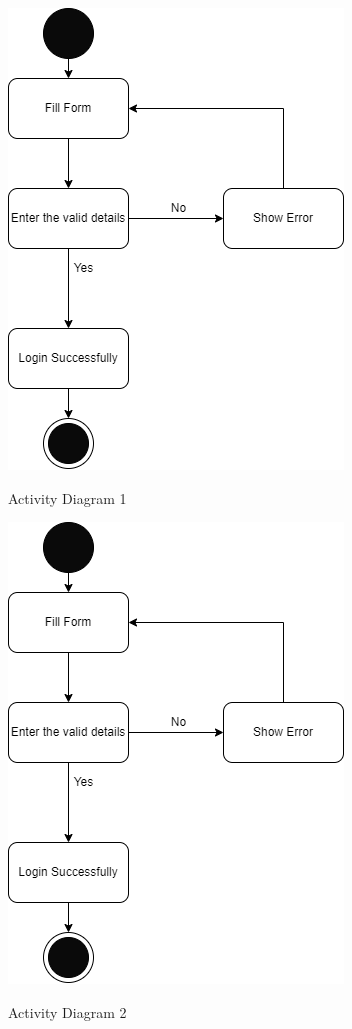\begin{figure}[H]
    \centering
    \caption{Activity Diagram 1}
    \includegraphics[scale=0.5]{./diagrams/Activity Diagram/ad-01.png}
    \label{fig:act-01}

\end{figure}


\begin{figure}[H]
    \centering
    \caption{Activity Diagram 2}
    \includegraphics[scale=0.5]{./diagrams/Activity Diagram/ad-02.png}
    \label{fig:act-02}

\end{figure}


